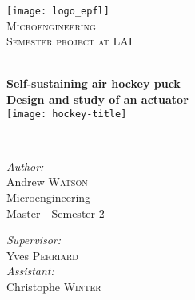 \begin{titlepage}
\nocite{*}      %
  \begin{center}
     
     
    \texttt{[image: logo\_epfl]}\\[1.5cm]
     
    \textsc{\LARGE Microengineering }\\[1.0cm]

    \textsc{\Large Semester project at LAI}\\[0.1cm]

    \vfill 
     
    \HRule \\[0.7cm]
    { \huge \bfseries Self-sustaining air hockey puck}\\[0.2cm]
    { \large \bfseries Design and study of an actuator}\\[0.4cm]

    \texttt{[image: hockey-title]} 
     
    \HRule \\[2.0cm]
    
    \begin{minipage}{0.4\textwidth}
      \begin{flushleft} \large
        \emph{Author:} \\
        Andrew \textsc{Watson}\\[0.7cm]

        Microengineering\\
        Master - Semester 2\\[0.5cm]
      \end{flushleft}
    \end{minipage}
    \begin{minipage}{0.4\textwidth}
      \begin{flushright} \large
        \emph{Supervisor:} \\
        Yves \textsc{Perriard}\\[0.7cm]

        \emph{Assistant:} \\
	Christophe \textsc{Winter}\\[0.5cm]
      \end{flushright}
    \end{minipage} \\[2cm]
     
    \vfill
     
    {\large \thedate}
     
  \end{center}

\end{titlepage}
